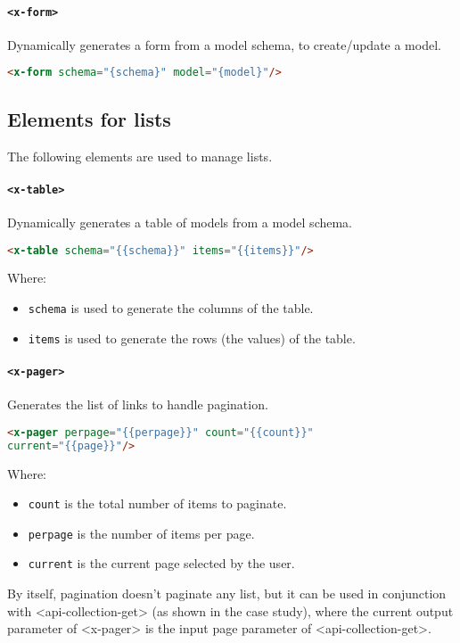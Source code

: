 \paragraph{\texttt{<x-form>}} Dynamically generates a form from a model schema, to create/update a model.
\begin{lstlisting}[language=html]
<x-form schema="{schema}" model="{model}"/>
\end{lstlisting}

\subsection{Elements for lists}

The following elements are used to manage lists.

\paragraph{\texttt{<x-table>}} Dynamically generates a table of models from a model schema.
\begin{lstlisting}[language=html]
<x-table schema="{{schema}}" items="{{items}}"/>
\end{lstlisting}
Where:
\begin{itemize}
\item \texttt{schema} is used to generate the columns of the table. 
\item \texttt{items} is used to generate the rows (the values) of the table.
\end{itemize}

\paragraph{\texttt{<x-pager>}} Generates the list of links to handle pagination.
\begin{lstlisting}[language=html]
<x-pager perpage="{{perpage}}" count="{{count}}" 
current="{{page}}"/>
\end{lstlisting}
Where:
\begin{itemize}
\item \texttt{count} is the total number of items to paginate.
\item \texttt{perpage} is the number of items per page.
\item \texttt{current} is the current page selected by the user.
\end{itemize}

By itself, pagination doesn’t paginate any list, but it can be used in conjunction with <api-collection-get> (as shown in the case study), where the current output parameter of <x-pager> is the input page parameter of  <api-collection-get>.


